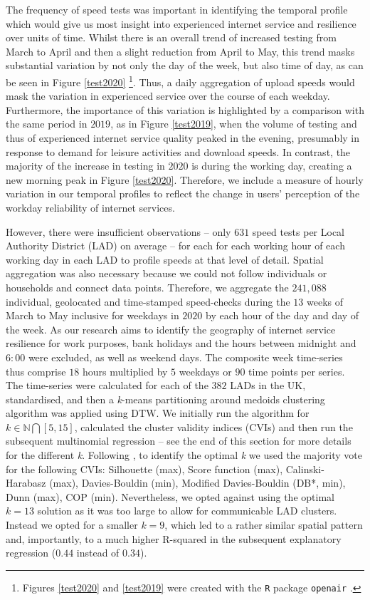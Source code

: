 \documentclass[]{interact}
\theoremstyle{plain}%
\theoremstyle{definition}
\theoremstyle{remark}
\begin{document}
The frequency of speed tests was important in identifying the temporal
profile which would give us most insight into experienced internet
service and resilience over units of time. Whilst there is an overall
trend of increased testing from March to April and then a slight
reduction from April to May, this trend masks substantial variation by
not only the day of the week, but also time of day, as can be seen in
Figure \ref{test2020} \footnote{Figures \ref{test2020} and
  \ref{test2019} were created with the \texttt{R} package
  \texttt{openair} \citep{openair}.}. Thus, a daily aggregation of
upload speeds would mask the variation in experienced service over the
course of each weekday. Furthermore, the importance of this variation is
highlighted by a comparison with the same period in \(2019\), as in
Figure \ref{test2019}, when the volume of testing and thus of
experienced internet service quality peaked in the evening, presumably
in response to demand for leisure activities and download speeds. In
contrast, the majority of the increase in testing in \(2020\) is during
the working day, creating a new morning peak in Figure \ref{test2020}.
Therefore, we include a measure of hourly variation in our temporal
profiles to reflect the change in users' perception of the workday
reliability of internet services.

However, there were insufficient observations -- only \(631\) speed
tests per Local Authority District (LAD) on average -- for each for each
working hour of each working day in each LAD to profile speeds at that
level of detail. Spatial aggregation was also necessary because we could
not follow individuals or households and connect data points. Therefore,
we aggregate the \(241,088\) individual, geolocated and time-stamped
speed-checks during the \(13\) weeks of March to May inclusive for
weekdays in \(2020\) by each hour of the day and day of the week. As our
research aims to identify the geography of internet service resilience
for work purposes, bank holidays and the hours between midnight and
\(6:00\) were excluded, as well as weekend days. The composite week
time-series thus comprise \(18\) hours multiplied by \(5\) weekdays or
\(90\) time points per series. The time-series were calculated for each
of the \(382\) LADs in the UK, standardised, and then a \emph{k}-means
partitioning around medoids clustering algorithm was applied using DTW.
We initially run the algorithm for \(k \in \mathbb{N} \bigcap [5,15]\),
calculated the cluster validity indices (CVIs) and then run the
subsequent multinomial regression -- see the end of this section for
more details for the different \emph{k}. Following \citet{sardatime}, to
identify the optimal \emph{k} we used the majority vote for the
following CVIs: Silhouette (max), Score function (max),
Calinski-Harabasz (max), Davies-Bouldin (min), Modified Davies-Bouldin
(DB*, min), Dunn (max), COP (min). Nevertheless, we opted against using
the optimal \(k = 13\) solution as it was too large to allow for
communicable LAD clusters. Instead we opted for a smaller \(k = 9\),
which led to a rather similar spatial pattern and, importantly, to a
much higher R-squared in the subsequent explanatory regression (\(0.44\)
instead of \(0.34\)).
\end{document}
